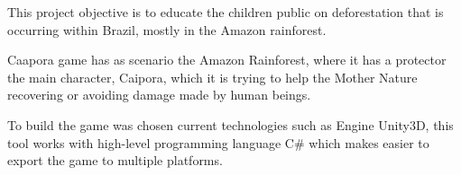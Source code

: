 This project objective  is to educate the children public on deforestation that is occurring within Brazil, mostly in the Amazon rainforest.

Caapora game has as scenario the Amazon Rainforest, where it has a protector the main character, Caipora, which it is trying to help the Mother Nature recovering or avoiding damage made by human beings.

To build the game was chosen current technologies such as  Engine Unity3D, this tool works with high-level programming language C\# which makes easier to export the game to multiple platforms.
